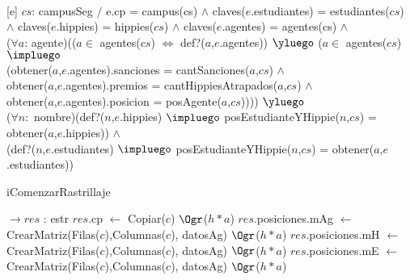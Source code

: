 \begin{Representacion}
  ~
  
  [e]
  {$cs$: campusSeg $/$ e.cp = campus(cs) $\land$ claves($e$.estudiantes) = estudiantes($cs$) \\ $\land$ claves($e$.hippies) = hippies($cs$) $\land$ claves($e$.agentes) = agentes(cs) $\land$ \\
  ($\forall a$: agente)(($a \in$ agentes($cs$) $\iff$ def?($a$,$e$.agentes)) $\yluego$ ($a \in$ agentes($cs$) $\impluego$ \\
  (obtener($a$,$e$.agentes).sanciones = cantSanciones($a$,$cs$) $\land$\\
  obtener($a$,$e$.agentes).premios = cantHippiesAtrapados($a$,$cs$) $\land$\\
  obtener($a$,$e$.agentes).posicion = posAgente($a$,$cs$)))) $\yluego$ \\
  ($\forall n:$ nombre)(def?($n$,$e$.hippies) $\impluego$ posEstudianteYHippie($n$,$cs$) = obtener($a$,$e$.hippies)) $\land$\\
  (def?($n$,$e$.estudiantes) $\impluego$ posEstudianteYHippie($n$,$cs$) = obtener($a$,$e$.estudiantes)) }


\begin{Algoritmos}

\begin{algorithm}[H]
\caption{iComenzarRastrillaje}

\begin{algorithmic}[1]
 $\to res$ : estr
	\State $res$.cp $\gets$ Copiar($c$) \Comment $\Ogr$($h*a$)
	\State $res$.posiciones.mAg $\gets$ CrearMatriz(Filas($c$),Columnas($c$), datosAg) \Comment $\Ogr$($h*a$)
	\State $res$.posiciones.mH $\gets$ CrearMatriz(Filas($c$),Columnas($c$), datosAg) \Comment $\Ogr$($h*a$)
	\State $res$.posiciones.mE $\gets$ CrearMatriz(Filas($c$),Columnas($c$), datosAg) \Comment $\Ogr$($h*a$)
	

\end{algorithmic}
\end{algorithm}
\end{Algoritmos}
\end{Representacion}
